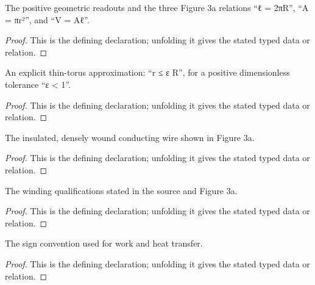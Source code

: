 \begin{definition}
  \label{decl:physics:IPhO_2026_3_A_1:HasFigure3aGeometry}
  The positive geometric readouts and the three Figure 3a relations “ℓ = 2πR”, “A = πr²”, and “V = Aℓ”.
\end{definition}
\begin{proof}
  This is the defining declaration; unfolding it gives the stated typed data or relation.
\end{proof}

\begin{definition}[IsThinToroidAtScale]
  \label{decl:physics:IPhO_2026_3_A_1:IsThinToroidAtScale}
  An explicit thin-torus approximation: “r ≤ ε R”, for a positive dimensionless tolerance “ε < 1”.
\end{definition}
\begin{proof}
  This is the defining declaration; unfolding it gives the stated typed data or relation.
\end{proof}

\begin{definition}[ToroidalWinding]
  \label{decl:physics:IPhO_2026_3_A_1:ToroidalWinding}
  The insulated, densely wound conducting wire shown in Figure 3a.
\end{definition}
\begin{proof}
  This is the defining declaration; unfolding it gives the stated typed data or relation.
\end{proof}

\begin{definition}[HasStatedWindingProperties]
  \label{decl:physics:IPhO_2026_3_A_1:HasStatedWindingProperties}
  The winding qualifications stated in the source and Figure 3a.
\end{definition}
\begin{proof}
  This is the defining declaration; unfolding it gives the stated typed data or relation.
\end{proof}

\begin{definition}[EnergyTransferSignConvention]
  \label{decl:physics:IPhO_2026_3_A_1:EnergyTransferSignConvention}
  The sign convention used for work and heat transfer.
\end{definition}
\begin{proof}
  This is the defining declaration; unfolding it gives the stated typed data or relation.
\end{proof}

